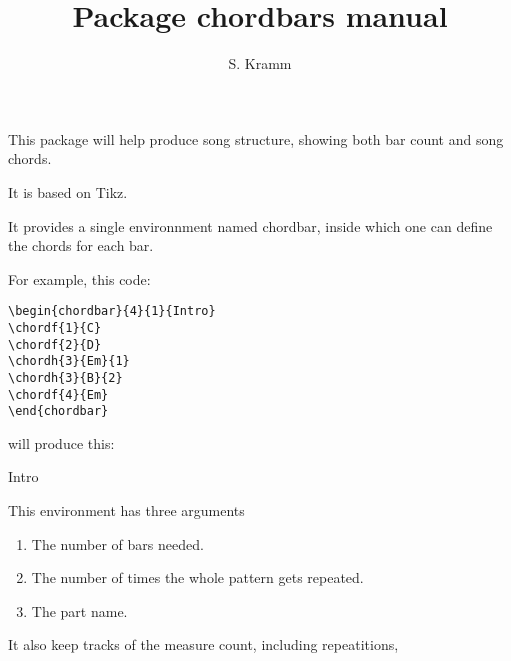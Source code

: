 \documentclass[11pt]{article}
\title{Package chordbars manual}
\author{S. Kramm}
\begin{document}
\maketitle

This package will help produce song structure, showing both bar count and song chords.

It is based on Tikz.

It provides a single environnment named {\ttfamily chordbar}, inside which one can define the chords for each bar.

For example, this code:

\begin{lstlisting}
\begin{chordbar}{4}{1}{Intro}
\chordf{1}{C}
\chordf{2}{D}
\chordh{3}{Em}{1}
\chordh{3}{B}{2}
\chordf{4}{Em}
\end{chordbar}
\end{lstlisting}

will produce this:

\begin{chordbar}{4}{1}{Intro}
\end{chordbar}


This environment has three arguments
\begin{enumerate}
\item The number of bars needed.
\item The number of times the whole pattern gets repeated.
\item The part name.
\end{enumerate}

It also keep tracks of the measure count, including repeatitions, 
\end{document}
